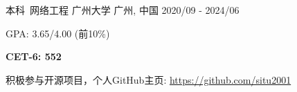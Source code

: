 

\begin{cventries}

  \cventry
    {本科\ 网络工程} %
    {广州大学} %
    {广州, 中国} %
    {2020/09 - 2024/06} %
    {
      \begin{cvitems} %
        \item {GPA: 3.65/4.00 (前10\%)}
        \item {\textbf{CET-6: 552}}
        \item {积极参与开源项目，个人GitHub主页: \href{https://github.com/situ2001}{https://github.com/situ2001}}
      \end{cvitems}
    }

\end{cventries}
